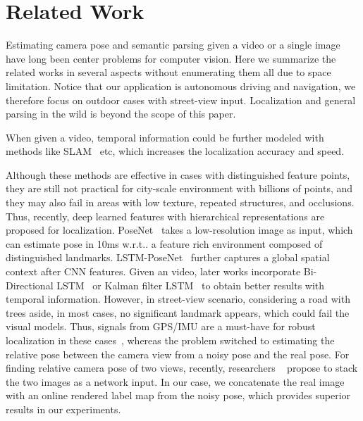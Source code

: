 \documentclass[10pt,twocolumn,letterpaper]{article}
\makeatletter
\DeclareRobustCommand\onedot{\futurelet\@let@token\@onedot}
\def\onedot{\ifx\@let@token.\else.\null\fi\xspace}
\def\wrt{w.r.t\onedot}
\makeatother
\begin{document}
\vspace{-0.6\baselineskip}\section{Related Work}\vspace{-0.5\baselineskip}\label{sec:related_work}
Estimating camera pose and semantic parsing given a video or a single image have long been center problems for computer vision.
Here we summarize the related works in several aspects without enumerating them all due to space limitation.
Notice that our application is autonomous driving and navigation, we therefore focus on outdoor cases with street-view input. 
Localization and general parsing in the wild is beyond the scope of this paper.

When given a video, temporal information could be further modeled with methods like SLAM~\cite{engel2014lsd} etc, which increases the localization accuracy and speed.

Although these methods are effective in cases with distinguished feature points, they are still not practical for city-scale environment with billions of points, and they may also fail in areas with low texture, repeated structures, and occlusions.
Thus, recently, deep learned features with hierarchical representations are proposed for localization. PoseNet~\cite{Kendall_2015_ICCV,kendall2017geometric} takes a low-resolution image as input, which can estimate pose in 10ms \wrt a feature rich environment composed of distinguished landmarks. LSTM-PoseNet~\cite{hazirbasimage} further captures a global spatial context after CNN features.
Given an video, later works incorporate Bi-Directional LSTM~\cite{DBLP:journals/corr/ClarkWMTW17} or Kalman filter LSTM~\cite{coskun2017long} to obtain better results with temporal information. However, in street-view scenario, considering a road with trees aside, in most cases, no significant landmark appears, which could fail the visual models. Thus, signals from GPS/IMU are a must-have for robust localization in these cases~\cite{vishal2015accurate}, whereas the problem switched to estimating the relative pose between the camera view from a noisy pose and the real pose. For finding relative camera pose of two views, recently, researchers ~\cite{laskar2017camera,ummenhofer2016demon} propose to stack the two images as a network input. In our case, we concatenate the real image with an online rendered label map from the noisy pose, which provides superior results in our experiments.
\end{document}
